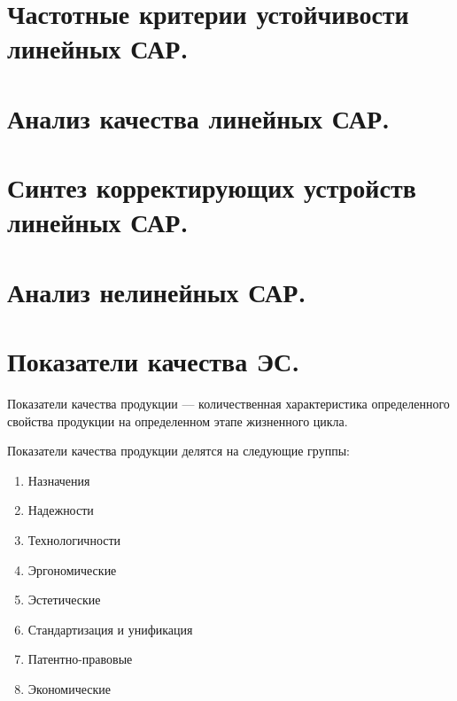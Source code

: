 \documentclass[unicode, 12pt, a4paper, oneside]{article}
\begin{document}
\section{Частотные критерии устойчивости линейных САР.}

\section{Анализ качества линейных САР.}

\section{Синтез корректирующих устройств линейных САР.}

\section{Анализ нелинейных САР.}

\section{Показатели качества ЭС.}

Показатели качества продукции --- количественная характеристика определенного свойства продукции на определенном этапе жизненного цикла.

Показатели качества продукции делятся на следующие группы:
\begin{enumerate}
\item Назначения
\item Надежности
\item Технологичности
\item Эргономические
\item Эстетические
\item Стандартизация и унификация
\item Патентно-правовые
\item Экономические
\end{enumerate}
\end{document}
